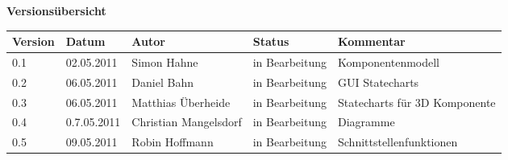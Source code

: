 

{\textbf{Versionsübersicht}}\\[2ex]

\begin{longtable}{|m{1.78cm}|m{1.59cm}|m{2.86cm}|m{1.9cm}|m{5.25cm}|}

  \hline                                              %

  \textbf{Version}  &    \textbf{Datum}  &    \textbf{Autor}  &
  \textbf{Status}   &    \textbf{Kommentar}       \\  %
  \hline                                              %

  0.1&02.05.2011&Simon Hahne&in Bearbeitung&Komponentenmodell\\
  \hline
  0.2&06.05.2011&Daniel Bahn&in Bearbeitung&GUI Statecharts\\
  \hline
  0.3&06.05.2011&Matthias Überheide&in Bearbeitung&Statecharts für 3D Komponente\\
  \hline
  0.4&0.7.05.2011&Christian Mangelsdorf&in Bearbeitung&Diagramme\\
  \hline
  0.5&09.05.2011&Robin Hoffmann&in Bearbeitung&Schnittstellenfunktionen\\
  \hline
  \hline                                              %

\end{longtable}




